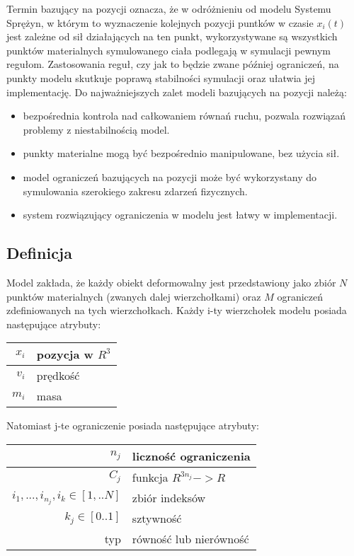 Termin bazujący na pozycji oznacza, że w odróżnieniu od modelu Systemu Sprężyn,
	   w którym to wyznaczenie kolejnych pozycji puntków w czasie $x_i(t)$ jest
	   zależne od sił działających na ten punkt, wykorzystywane są 
wszystkich punktów materialnych symulowanego ciała podlegają w symulacji pewnym
regułom. Zastosowania reguł, czy jak to będzie zwane później ograniczeń, na
punkty modelu skutkuje poprawą stabilności symulacji oraz ułatwia jej
implementację. Do najważniejszych zalet modeli bazujących na pozycji należą:

\begin{itemize}
	\item bezpośrednia kontrola nad całkowaniem równań ruchu, pozwala rozwiązań
	problemy z niestabilnością model.
	\item punkty materialne mogą być bezpośrednio manipulowane, bez użycia sił.
	\item model ograniczeń bazujących na pozycji może być wykorzystany do
	symulowania szerokiego zakresu zdarzeń fizycznych.
	\item system rozwiązujący ograniczenia w modelu jest łatwy w implementacji.
\end{itemize}

\subsection{Definicja}
Model zakłada, że każdy obiekt deformowalny jest przedstawiony jako zbiór $N$
punktów materialnych (zwanych dalej wierzchołkami) oraz $M$ ograniczeń
zdefiniowanych na tych wierzchołkach. Każdy i-ty wierzchołek modelu posiada
następujące atrybuty:

\centering
\begin{tabular}{|r|l|}
\hline
$x_i$ & pozycja w $R^3$ \\
\hline
$v_i$ & prędkość \\
\hline
$m_i$ & masa\\
\hline
\end{tabular}

\raggedright
Natomiast j-te ograniczenie posiada następujące atrybuty:

\centering
\begin{tabular}{|r|l|}
\hline
$n_j$ & liczność ograniczenia \\
\hline
$C_j$ & funkcja $R^{3n_j} -> R$\\
\hline
${i_1, ..., i_{n_j}}, i_k \in [1,..N]$ & zbiór indeksów\\
\hline
$k_j \in [0.. 1]$ & sztywność\\
\hline
typ & równość lub nierówność\\
\hline
\end{tabular}

